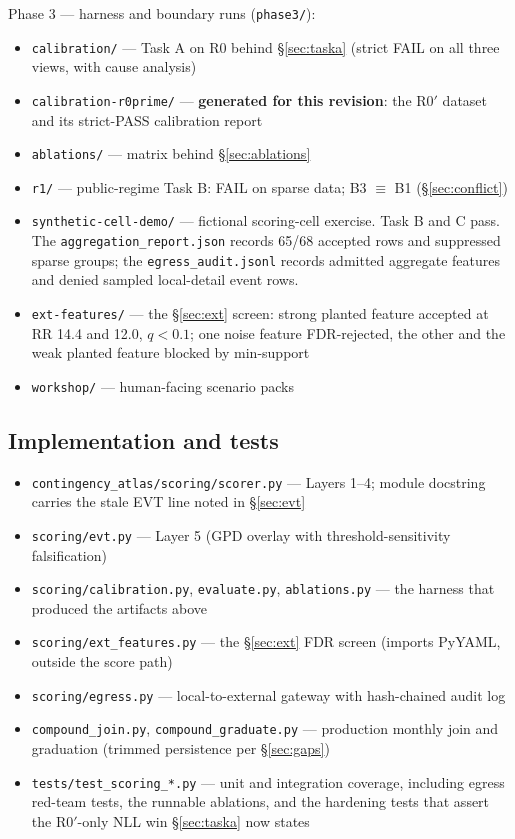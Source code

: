 \documentclass[11pt]{article}
\begin{document}
Phase 3 --- harness and boundary runs (\texttt{phase3/}):

\begin{itemize}[leftmargin=1.4em,itemsep=1pt]
\item \texttt{calibration/} --- Task A on R0 behind \S\ref{sec:taska}
  (strict FAIL on all three views, with cause analysis)
\item \texttt{calibration-r0prime/} --- \textbf{generated for this
  revision}: the R0$'$ dataset and its strict-PASS calibration report
\item \texttt{ablations/} --- matrix behind \S\ref{sec:ablations}
\item \texttt{r1/} --- public-regime Task B: FAIL on sparse data;
  B3 $\equiv$ B1 (\S\ref{sec:conflict})
\item \texttt{synthetic-cell-demo/} --- fictional scoring-cell exercise.
  Task B and C pass. The \texttt{aggregation\_\allowbreak report.json}
  records 65/68 accepted rows and suppressed sparse groups; the
  \texttt{egress\_\allowbreak audit.jsonl} records admitted aggregate
  features and denied sampled local-detail event rows.
\item \texttt{ext-features/} --- the \S\ref{sec:ext} screen: strong planted
  feature accepted at RR 14.4 and 12.0, $q < 0.1$; one noise feature
  FDR-rejected, the other and the weak planted feature blocked by
  min-support
\item \texttt{workshop/} --- human-facing scenario packs
\end{itemize}

\subsection{Implementation and tests}

\begin{itemize}[leftmargin=1.4em,itemsep=1pt]
\item \texttt{contingency\_atlas/scoring/scorer.py} --- Layers 1--4; module
  docstring carries the stale EVT line noted in \S\ref{sec:evt}
\item \texttt{scoring/evt.py} --- Layer 5 (GPD overlay with
  threshold-sensitivity falsification)
\item \texttt{scoring/calibration.py}, \texttt{evaluate.py},
  \texttt{ablations.py} --- the harness that produced the artifacts above
\item \texttt{scoring/ext\_features.py} --- the \S\ref{sec:ext} FDR screen
  (imports PyYAML, outside the score path)
\item \texttt{scoring/egress.py} --- local-to-external gateway with
  hash-chained audit log
\item \texttt{compound\_join.py}, \texttt{compound\_graduate.py} ---
  production monthly join and graduation (trimmed persistence per
  \S\ref{sec:gaps})
\item \texttt{tests/test\_scoring\_*.py} --- unit and integration coverage,
  including egress red-team tests, the runnable ablations, and the
  hardening tests that assert the R0$'$-only NLL win \S\ref{sec:taska} now
  states
\end{itemize}
\end{document}
